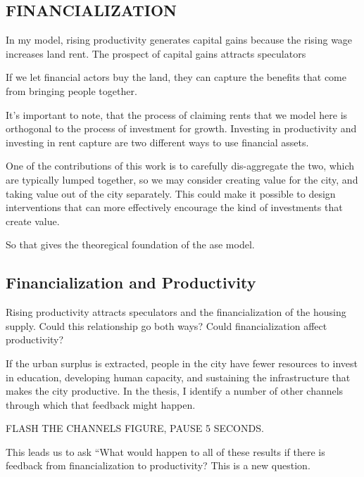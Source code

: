 \documentclass[]{article}
\begin{document}
\subsection{FINANCIALIZATION}

In my model, rising productivity generates capital gains because the rising wage increases land rent. The prospect of capital gains attracts speculators

If we let financial actors buy the land, they can capture the benefits that come from bringing people together.

It’s important to note, that the process of claiming rents that we model here is orthogonal to the process of investment for growth. Investing in productivity and investing in rent capture are two different ways to use financial assets.


One of the contributions of this work is to carefully dis-aggregate the two, which are typically lumped together, so we may consider creating value for the city, and taking value out of the city separately. 
This could make it possible to design interventions that can more effectively encourage the kind of investments that create value.

So that gives the theoregical foundation of the ase model.

\subsection{Financialization and Productivity} 
Rising productivity attracts speculators and the financialization of the housing supply. 
Could this relationship go both ways? Could financialization affect productivity?

If the urban surplus is extracted, people in the city have fewer resources to invest in education, developing human capacity, and sustaining the infrastructure that makes the city productive. In the thesis, I identify a number of other channels through which that feedback might happen.

\hspace{2cm}FLASH THE CHANNELS FIGURE, PAUSE 5 SECONDS.

This leads us to ask “What would happen to all of these results if there is feedback from financialization to productivity?  
This is a new question. 
\end{document}
